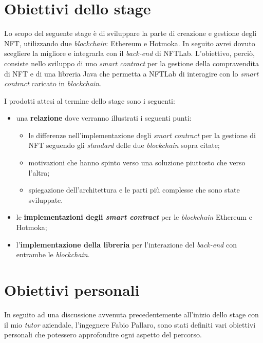 
\section{Obiettivi dello stage}
Lo scopo del seguente stage è di sviluppare la parte di creazione e gestione degli NFT, utilizzando due \textit{blockchain}: Ethereum e Hotmoka. In seguito avrei dovuto scegliere la migliore e integrarla con il \textit{back-end} di NFTLab. L'obiettivo, perciò, consiste nello sviluppo di uno \textit{smart contract} per la gestione della compravendita di NFT e di una libreria Java che permetta a NFTLab di interagire con lo \textit{smart contract} caricato in \textit{blockchain}. \newline

\noindent I prodotti attesi al termine dello stage sono i seguenti:
\begin{itemize}
  \item una \textbf{relazione} dove verranno illustrati i seguenti punti:
  \begin{itemize}
    \item le differenze nell'implementazione degli \textit{smart contract} per la gestione di NFT seguendo gli \textit{standard} delle due \textit{blockchain} sopra citate;
    \item motivazioni che hanno spinto verso una soluzione piuttosto che verso l'altra;
    \item spiegazione dell'architettura e le parti più complesse che sono state sviluppate.
  \end{itemize}
  \item le \textbf{implementazioni degli \textit{smart contract}} per le \textit{blockchain} Ethereum e Hotmoka;
  \item l'\textbf{implementazione della libreria} per l'interazione del \textit{back-end} con entrambe le \textit{blockchain}.
\end{itemize}

\section{Obiettivi personali}
In seguito ad una discussione avvenuta precedentemente all'inizio dello stage con il mio \textit{tutor} aziendale, l'ingegnere Fabio Pallaro, sono stati definiti vari obiettivi personali che potessero approfondire ogni aspetto del percorso. \\

